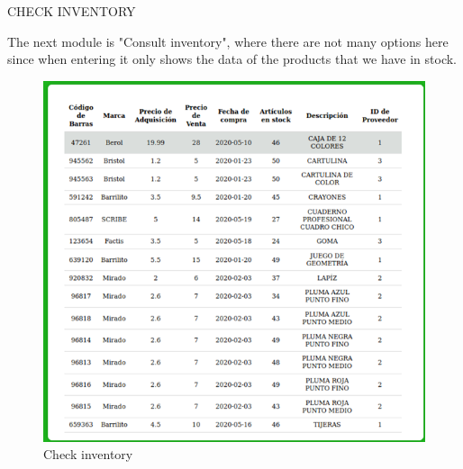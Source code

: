 \documentclass{article}
\begin{document}
\pagebreak

\begin{center}
CHECK INVENTORY
\end{center}

The next module is "Consult inventory", where there are not many options here since when entering it only shows the data of the products that we have in stock.\\

\begin{figure}[h]
\caption {Check inventory}
\centering
\includegraphics[width=\textwidth]{fig8}
\end{figure}

\pagebreak
\end{document}
